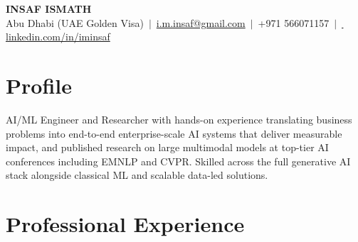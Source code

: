\documentclass[10pt]{article}
\begin{document}
\begin{center}
    {\LARGE\bfseries\textcolor{accent}{INSAF ISMATH}} \\[4pt]
    {\small Abu Dhabi (UAE Golden Visa) \,$|$\, \href{mailto:i.m.insaf@gmail.com}{\textcolor{accentlight}{i.m.insaf@gmail.com}} \,$|$\, \textcolor{accentlight}{+971 566071157} \,$|$\, \href{https://www.linkedin.com/in/iminsaf}{\faLinkedin\, \textcolor{linkblue}{linkedin.com/in/iminsaf}}}
\end{center}

\vspace{-1pt}

\section{Profile}
AI/ML Engineer and Researcher with hands-on experience translating business problems into end-to-end enterprise-scale AI systems that deliver measurable impact, and published research on large multimodal models at top-tier AI conferences including EMNLP and CVPR. Skilled across the full generative AI stack alongside classical ML and scalable data-led solutions.
\section{Professional Experience}
\end{document}
